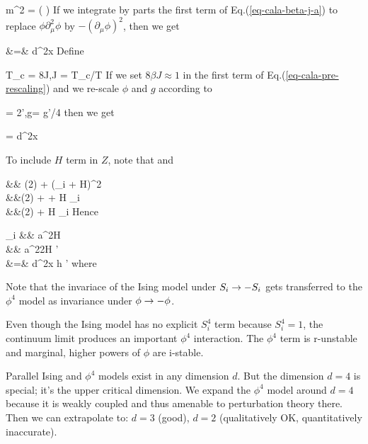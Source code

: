 \beq
m^2 = 
\left(
\right)
\eeq
If we integrate by parts the first term
of Eq.(\ref{eq-cala-beta-j-a}) to replace $\phi\partial^2_\mu\phi$ by $-(\partial_\mu \phi)^2$,
then we get


\beqa
\cala[\phi]
&=&
\int d^2x\;
\label{eq-cala-pre-rescaling}
\eeqa 
Define

\beq
T_c = 8J,\beta J = T_c/T
\eeq
If  we set $8\beta J\approx 1$ in the first term of Eq.(\ref{eq-cala-pre-rescaling}) and
we re-scale $\phi$ and $ g$ according to

\beq
\phi = 2\phi',\quad   g=  g'/4
\eeq
then we get

\beq
{}
\eeq

\beq
{}
\eeq

\beq
\cala[\phi']=
\int d^2x\;
\eeq


To  include  $H$ term in $Z$,
note that
\beq
{}
\rarrow {}
\eeq
and

\beqa
{}
&\approx& \ln(2) +  (\phi_i + \beta H)^2
\\
&\approx&\ln(2) +   + \beta H  \phi_i
\\
&\approx&\ln(2) +  \beta H \phi_i
\eeqa
Hence

\beqa
\sum_i 
&\rarrow&\int {} {a^2}\;\beta H \phi
\\
&\rarrow&\int {} {a^2}2\beta H \phi'\quad {}
\\
&=&
\int d^2x\; h \phi'
\eeqa
where

\beq
{}
\eeq


Note that the invariace of the Ising model under $S_i\rightarrow -S_i$ gets
transferred to the $\phi^4$  model  as invariance under $\phi \rightarrow -\phi$.

Even though the Ising model has no explicit $ S_i^4 $ term because
 $
S_i^4 = 1
 $, the continuum limit
 produces an important $ \phi^4 $ interaction. The $ \phi^4 $   term is r-unstable and marginal,
  higher powers of $\phi$ are   i-stable.

Parallel Ising and $\phi^4$ models exist in any dimension $d$. But the dimension $d=4$ is
  special; it's 
 the   upper critical dimension.
We expand the $\phi^4$ model around $d=4$ because
it  is weakly coupled and thus amenable to
perturbation theory there.
Then we can extrapolate to:
$ d=3 $ (good),
  $ d=2 $ (qualitatively OK, quantitatively inaccurate).

